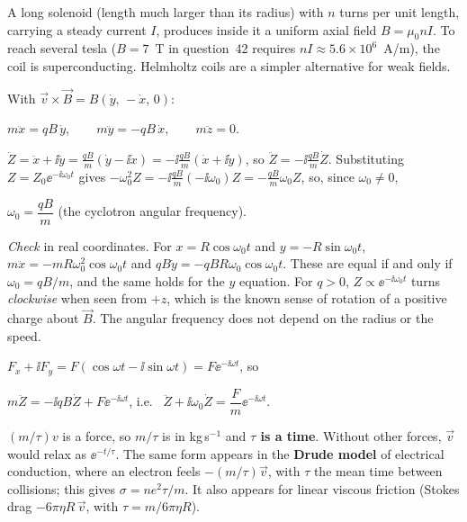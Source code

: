 \documentclass[11pt,a4paper]{article}
\newcommand{\vv}[1]{\vec{#1}}
\begin{document}
A long solenoid (length much larger than its radius) with $n$ turns per unit length, carrying
a steady current $I$, produces inside it a uniform axial field $B = \mu_0nI$. To reach several
tesla ($B = 7$~T in question~42 requires $nI\approx5.6\times10^6$~A/m), the coil is
superconducting. Helmholtz coils are a simpler alternative for weak fields.

With $\vv v\times\vv B = B(\dot y,\,-\dot x,\,0)$:
\begin{result}
$m\ddot x = qB\,\dot y,\qquad m\ddot y = -qB\,\dot x,\qquad m\ddot z = 0.$
\end{result}

$\ddot Z = \ddot x + \ii\ddot y = \frac{qB}m(\dot y - \ii\dot x) = -\ii\frac{qB}m(\dot x + \ii\dot y)$,
so $\ddot Z = -\ii\frac{qB}{m}\dot Z$. Substituting $Z = Z_0\ee^{-\ii\omega_0t}$ gives
$-\omega_0^2Z = -\ii\frac{qB}m(-\ii\omega_0)Z = -\frac{qB}m\omega_0Z$, so, since
$\omega_0\neq0$,
\begin{result}
$\omega_0 = \dfrac{qB}{m}$ \quad (the cyclotron angular frequency).
\end{result}
\emph{Check} in real coordinates. For $x = R\cos\omega_0t$ and $y = -R\sin\omega_0t$,
$m\ddot x = -mR\omega_0^2\cos\omega_0t$ and $qB\dot y = -qBR\omega_0\cos\omega_0t$. These are
equal if and only if $\omega_0 = qB/m$, and the same holds for the $y$ equation. For $q > 0$,
$Z\propto\ee^{-\ii\omega_0t}$ turns \emph{clockwise} when seen from $+z$, which is the known
sense of rotation of a positive charge about $\vv B$. The angular frequency does not depend on
the radius or the speed.


$F_x + \ii F_y = F(\cos\omega t - \ii\sin\omega t) = F\ee^{-\ii\omega t}$, so
\begin{result}
$m\ddot Z = -\ii qB\dot Z + F\ee^{-\ii\omega t}$, \quad i.e.\ \quad
$\ddot Z + \ii\omega_0\dot Z = \dfrac Fm\ee^{-\ii\omega t}$.
\end{result}

$(m/\tau)v$ is a force, so $m/\tau$ is in kg\,s$^{-1}$ and \textbf{$\tau$ is a time}. Without
other forces, $\vv v$ would relax as $\ee^{-t/\tau}$. The same form appears in the
\textbf{Drude model} of electrical conduction, where an electron feels $-(m/\tau)\vv v$, with
$\tau$ the mean time between collisions; this gives $\sigma = ne^2\tau/m$. It also appears for
linear viscous friction (Stokes drag $-6\pi\eta R\,\vv v$, with $\tau = m/6\pi\eta R$).
\end{document}
